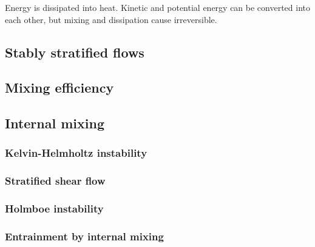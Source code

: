 Energy is dissipated into heat. Kinetic and potential energy can be converted
into each other, but mixing and dissipation cause irreversible. 

\subsection{Stably stratified flows}

\subsection{Mixing efficiency}

\subsection{Internal mixing}
\subsubsection{Kelvin-Helmholtz instability}
\subsubsection{Stratified shear flow}
\subsubsection{Holmboe instability}
\subsubsection{Entrainment by internal mixing}
